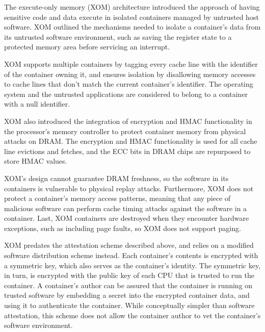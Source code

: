 
The execute-only memory (XOM) architecture \cite{lie2000xom} introduced the
approach of having sensitive code and data execute in isolated containers
managed by untrusted host software. XOM outlined the mechanisms needed to
isolate a container's data from its untrusted software environment, such as
saving the register state to a protected memory area before servicing an
interrupt.

XOM supports multiple containers by tagging every cache line with the
identifier of the container owning it, and ensures isolation by disallowing
memory accesses to cache lines that don't match the current container's
identifier. The operating system and the untrusted applications are considered
to belong to a container with a null identifier.

XOM also introduced the integration of encryption and HMAC functionality in
the processor's memory controller to protect container memory from physical
attacks on DRAM. The encryption and HMAC functionality is used for all cache
line evictions and fetches, and the ECC bits in DRAM chips are repurposed to
store HMAC values.

XOM's design cannot guarantee DRAM freshness, so the software in its containers
is vulnerable to physical replay attacks. Furthermore, XOM does not protect a
container's memory access patterns, meaning that any piece of malicious
software can perform cache timing attacks against the software in a container.
Last, XOM containers are destroyed when they encounter hardware exceptions,
such as including page faults, so XOM does not support paging.

XOM predates the attestation scheme described above, and relies on a modified
software distribution scheme instead. Each container's contents is encrypted
with a symmetric key, which also serves as the container's identity. The
symmetric key, in turn, is encrypted with the public key of each CPU that is
trusted to run the container. A container's author can be assured that the
container is running on trusted software by embedding a secret into the
encrypted container data, and using it to authenticate the container. While
conceptually simpler than software attestation, this scheme does not allow the
container author to vet the container's software environment.
